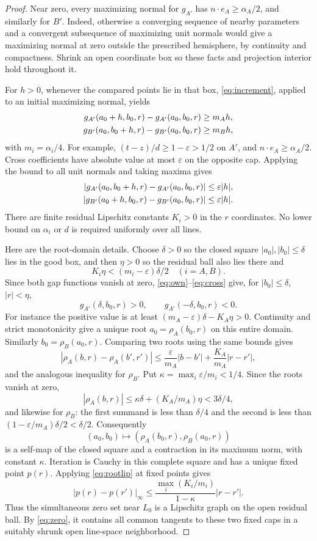 \documentclass[11pt]{article}
\newcommand{\eps}{\varepsilon}
\theoremstyle{remark}
\begin{document}
\begin{proof}
Near zero, every maximizing normal for $g_{A'}$ has $n\cdot e_A\ge\alpha_A/2$, and similarly for $B'$. Indeed, otherwise a converging sequence of nearby parameters and a convergent subsequence of maximizing unit normals would give a maximizing normal at zero outside the prescribed hemisphere, by continuity and compactness. Shrink an open coordinate box so these facts and projection interior hold throughout it.

For $h>0$, whenever the compared points lie in that box, \eqref{eq:increment}, applied to an initial maximizing normal, yields
\begin{align}
g_{A'}(a_0+h,b_0,r)-g_{A'}(a_0,b_0,r)&\ge m_Ah,\label{eq:own}\\
g_{B'}(a_0,b_0+h,r)-g_{B'}(a_0,b_0,r)&\ge m_Bh,\notag
\end{align}
with $m_i=\alpha_i/4$. For example, $(t-z)/d\ge1-\eps>1/2$ on $A'$, and $n\cdot e_A\ge\alpha_A/2$. Cross coefficients have absolute value at most $\eps$ on the opposite cap. Applying the bound to all unit normals and taking maxima gives
\begin{align}
|g_{A'}(a_0,b_0+h,r)-g_{A'}(a_0,b_0,r)|&\le\eps|h|,\label{eq:cross}\\
|g_{B'}(a_0+h,b_0,r)-g_{B'}(a_0,b_0,r)|&\le\eps|h|.\notag
\end{align}
There are finite residual Lipschitz constants $K_i>0$ in the $r$ coordinates. No lower bound on $\alpha_i$ or $d$ is required uniformly over all lines.

Here are the root-domain details. Choose $\delta>0$ so the closed square $|a_0|,|b_0|\le\delta$ lies in the good box, and then $\eta>0$ so the residual ball also lies there and
\[
K_i\eta<(m_i-\eps)\delta/2\quad(i=A,B).
\]
Since both gap functions vanish at zero, \eqref{eq:own}--\eqref{eq:cross} give, for $|b_0|\le\delta$, $|r|<\eta$,
\[
g_{A'}(\delta,b_0,r)>0,\qquad g_{A'}(-\delta,b_0,r)<0.
\]
For instance the positive value is at least $(m_A-\eps)\delta-K_A\eta>0$. Continuity and strict monotonicity give a unique root $a_0=\rho_A(b_0,r)$ on this entire domain. Similarly $b_0=\rho_B(a_0,r)$. Comparing two roots using the same bounds gives
\begin{equation}\label{eq:rootlip}
|\rho_A(b,r)-\rho_A(b',r')|
\le\frac{\eps}{m_A}|b-b'|+\frac{K_A}{m_A}|r-r'|,
\end{equation}
and the analogous inequality for $\rho_B$. Put $\kappa=\max_i\eps/m_i<1/4$. Since the roots vanish at zero,
\[
|\rho_A(b,r)|\le\kappa\delta+(K_A/m_A)\eta<3\delta/4,
\]
and likewise for $\rho_B$: the first summand is less than $\delta/4$ and the second is less than $(1-\eps/m_A)\delta/2<\delta/2$. Consequently
\[
(a_0,b_0)\longmapsto(\rho_A(b_0,r),\rho_B(a_0,r))
\]
is a self-map of the closed square and a contraction in its maximum norm, with constant $\kappa$. Iteration is Cauchy in this complete square and has a unique fixed point $p(r)$. Applying \eqref{eq:rootlip} at fixed points gives
\[
|p(r)-p(r')|_\infty
\le\frac{\max_i(K_i/m_i)}{1-\kappa}|r-r'|.
\]
Thus the simultaneous zero set near $L_0$ is a Lipschitz graph on the open residual ball. By \eqref{eq:zero}, it contains all common tangents to these two fixed caps in a suitably shrunk open line-space neighborhood.


\end{proof}
\end{document}
